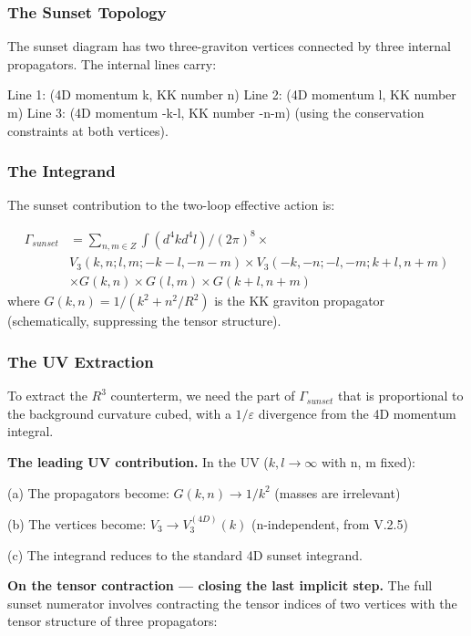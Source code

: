 \documentclass[aps,prd,preprint,superscriptaddress,longbibliography,floatfix]{revtex4-2}
\theoremstyle{remark}
\begin{document}
\subsubsection{The Sunset Topology}

The sunset diagram has two three-graviton vertices connected by three internal propagators. The internal lines carry:


Line 1: (4D momentum k, KK number n)
Line 2: (4D momentum l, KK number m)
Line 3: (4D momentum -k-l, KK number -n-m)
(using the conservation constraints at both vertices).


\subsubsection{The Integrand}

The sunset contribution to the two-loop effective action is:


\begin{align}
    \Gamma_{sunset} &= \sum_{n,m \in Z} \int (d^{4}k d^{4}l)/(2\pi)^{8} \times \\
    & V_{3}(k,n; l,m; -k-l,-n-m) \times V_{3}(-k,-n; -l,-m; k+l,n+m) \\
    & \times G(k,n) \times G(l,m) \times G(k+l,n+m)
\end{align}
where $G(k,n) = 1/(k^{2} + n^{2}/R^{2})$ is the KK graviton propagator (schematically, suppressing the tensor structure).


\subsubsection{The UV Extraction}

To extract the $R^{3}$ counterterm, we need the part of $\Gamma_{sunset}$ that is proportional to the background curvature cubed, with a $1/\varepsilon$ divergence from the 4D momentum integral.

\textbf{The leading UV contribution.} In the UV ($k, l \to \infty$ with n, m fixed):

(a) The propagators become: $G(k,n) \to 1/k^{2}$ (masses are irrelevant)

(b) The vertices become: $V_{3} \to V_{3}^{(4D)}(k)$ (n-independent, from V.2.5)

(c) The integrand reduces to the standard 4D sunset integrand.

\textbf{On the tensor contraction --- closing the last implicit step.} The full sunset numerator involves contracting the tensor indices of two vertices with the tensor structure of three propagators:
\end{document}
